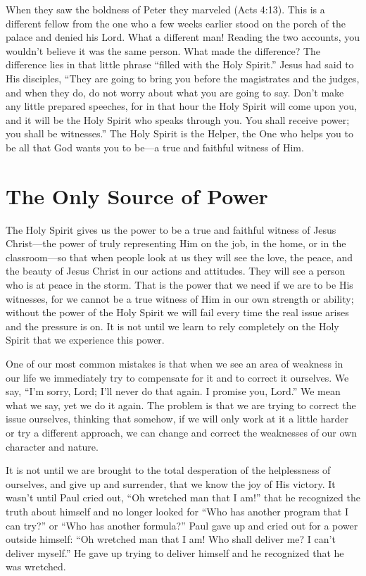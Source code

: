 When they saw the boldness of Peter they marveled
(Acts 4:13). This is a different fellow from the one who a few
weeks earlier stood on the porch of the palace and denied
his Lord. What a different man! Reading the two accounts,
you wouldn’t believe it was the same person. What made
the difference? The difference lies in that little phrase “filled
with the Holy Spirit.” Jesus had said to His disciples, “They
are going to bring you before the magistrates and the
judges, and when they do, do not worry about what you
are going to say. Don’t make any little prepared speeches,
for in that hour the Holy Spirit will come upon you, and it
will be the Holy Spirit who speaks through you. You shall
receive power; you shall be witnesses.” The Holy Spirit is
the Helper, the One who helps you to be all that God wants
you to be—a true and faithful witness of Him.


\section*{The Only Source of Power}

The Holy Spirit gives us the power to be a true and
faithful witness of Jesus Christ—the power of truly representing
Him on the job, in the home, or in the classroom—so
that when people look at us they will see the love, the peace,
and the beauty of Jesus Christ in our actions and attitudes.
They will see a person who is at peace in the storm. That is
the power that we need if we are to be His witnesses, for we
cannot be a true witness of Him in our own strength or ability;
without the power of the Holy Spirit we will fail every
time the real issue arises and the pressure is on. It is not
until we learn to rely completely on the Holy Spirit that we
experience this power.

One of our most common mistakes is that when we see
an area of weakness in our life we immediately try to compensate
for it and to correct it ourselves. We say, “I’m sorry,
Lord; I’ll never do that again. I promise you, Lord.” We
mean what we say, yet we do it again. The problem is that
we are trying to correct the issue ourselves, thinking that
somehow, if we will only work at it a little harder or try
a different approach, we can change and correct the weaknesses
of our own character and nature.

It is not until we are brought to the total desperation
of the helplessness of ourselves, and give up and surrender,
that we know the joy of His victory. It wasn’t until Paul
cried out, “Oh wretched man that I am!” that he recognized
the truth about himself and no longer looked for “Who has
another program that I can try?” or “Who has another formula?”
Paul gave up and cried out for a power outside himself:
“Oh wretched man that I am! Who shall deliver me? I
can’t deliver myself.” He gave up trying to deliver himself
and he recognized that he was wretched.

